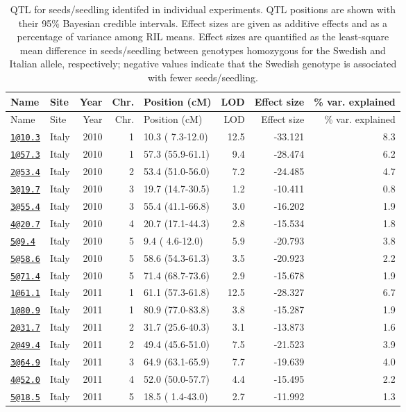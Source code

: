 \documentclass[]{article}
\begin{document}
\begin{longtable}[]{@{}llrrlrrr@{}}
\caption{\label{tab:individual-tfit-qtl}QTL for seeds/seedling identifed in individual experiments. QTL positions are shown with their 95\% Bayesian credible intervals. Effect sizes are given as additive effects and as a percentage of variance among RIL means. Effect sizes are quantified as the least-square mean difference in seeds/seedling between genotypes homozygous for the Swedish and Italian allele, respectively; negative values indicate that the Swedish genotype is associated with fewer seeds/seedling.}\tabularnewline
\toprule
Name & Site & Year & Chr. & Position (cM) & LOD & Effect size & \% var. explained\tabularnewline
\midrule
\endfirsthead
\toprule
Name & Site & Year & Chr. & Position (cM) & LOD & Effect size & \% var. explained\tabularnewline
\midrule
\endhead
\href{mailto:1@10.3}{\nolinkurl{1@10.3}} & Italy & 2010 & 1 & 10.3 ( 7.3-12.0) & 12.5 & -33.121 & 8.3\tabularnewline
\href{mailto:1@57.3}{\nolinkurl{1@57.3}} & Italy & 2010 & 1 & 57.3 (55.9-61.1) & 9.4 & -28.474 & 6.2\tabularnewline
\href{mailto:2@53.4}{\nolinkurl{2@53.4}} & Italy & 2010 & 2 & 53.4 (51.0-56.0) & 7.2 & -24.485 & 4.7\tabularnewline
\href{mailto:3@19.7}{\nolinkurl{3@19.7}} & Italy & 2010 & 3 & 19.7 (14.7-30.5) & 1.2 & -10.411 & 0.8\tabularnewline
\href{mailto:3@55.4}{\nolinkurl{3@55.4}} & Italy & 2010 & 3 & 55.4 (41.1-66.8) & 3.0 & -16.202 & 1.9\tabularnewline
\href{mailto:4@20.7}{\nolinkurl{4@20.7}} & Italy & 2010 & 4 & 20.7 (17.1-44.3) & 2.8 & -15.534 & 1.8\tabularnewline
\href{mailto:5@9.4}{\nolinkurl{5@9.4}} & Italy & 2010 & 5 & 9.4 ( 4.6-12.0) & 5.9 & -20.793 & 3.8\tabularnewline
\href{mailto:5@58.6}{\nolinkurl{5@58.6}} & Italy & 2010 & 5 & 58.6 (54.3-61.3) & 3.5 & -20.923 & 2.2\tabularnewline
\href{mailto:5@71.4}{\nolinkurl{5@71.4}} & Italy & 2010 & 5 & 71.4 (68.7-73.6) & 2.9 & -15.678 & 1.9\tabularnewline
\href{mailto:1@61.1}{\nolinkurl{1@61.1}} & Italy & 2011 & 1 & 61.1 (57.3-61.8) & 12.5 & -28.327 & 6.7\tabularnewline
\href{mailto:1@80.9}{\nolinkurl{1@80.9}} & Italy & 2011 & 1 & 80.9 (77.0-83.8) & 3.8 & -15.287 & 1.9\tabularnewline
\href{mailto:2@31.7}{\nolinkurl{2@31.7}} & Italy & 2011 & 2 & 31.7 (25.6-40.3) & 3.1 & -13.873 & 1.6\tabularnewline
\href{mailto:2@49.4}{\nolinkurl{2@49.4}} & Italy & 2011 & 2 & 49.4 (45.6-51.0) & 7.5 & -21.523 & 3.9\tabularnewline
\href{mailto:3@64.9}{\nolinkurl{3@64.9}} & Italy & 2011 & 3 & 64.9 (63.1-65.9) & 7.7 & -19.639 & 4.0\tabularnewline
\href{mailto:4@52.0}{\nolinkurl{4@52.0}} & Italy & 2011 & 4 & 52.0 (50.0-57.7) & 4.4 & -15.495 & 2.2\tabularnewline
\href{mailto:5@18.5}{\nolinkurl{5@18.5}} & Italy & 2011 & 5 & 18.5 ( 1.4-43.0) & 2.7 & -11.992 & 1.3\tabularnewline

\end{longtable}
\end{document}
